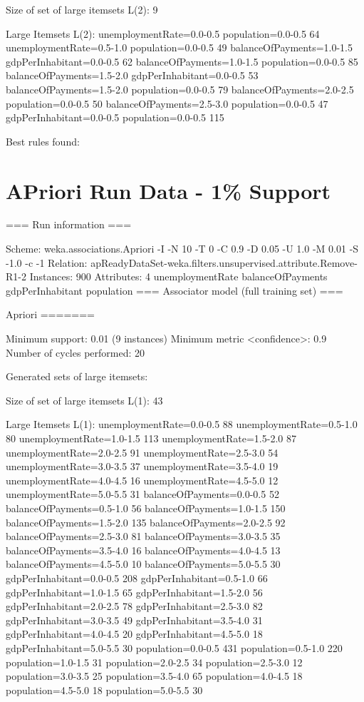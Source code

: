 Size of set of large itemsets L(2): 9

Large Itemsets L(2):
unemploymentRate=0.0-0.5 population=0.0-0.5 64
unemploymentRate=0.5-1.0 population=0.0-0.5 49
balanceOfPayments=1.0-1.5 gdpPerInhabitant=0.0-0.5 62
balanceOfPayments=1.0-1.5 population=0.0-0.5 85
balanceOfPayments=1.5-2.0 gdpPerInhabitant=0.0-0.5 53
balanceOfPayments=1.5-2.0 population=0.0-0.5 79
balanceOfPayments=2.0-2.5 population=0.0-0.5 50
balanceOfPayments=2.5-3.0 population=0.0-0.5 47
gdpPerInhabitant=0.0-0.5 population=0.0-0.5 115

Best rules found:

\section{APriori Run Data - 1\% Support}

=== Run information ===

Scheme:       weka.associations.Apriori -I -N 10 -T 0 -C 0.9 -D 0.05 -U 1.0 -M 0.01 -S -1.0 -c -1
Relation:     apReadyDataSet-weka.filters.unsupervised.attribute.Remove-R1-2
Instances:    900
Attributes:   4
              unemploymentRate
              balanceOfPayments
              gdpPerInhabitant
              population
=== Associator model (full training set) ===


Apriori
=======

Minimum support: 0.01 (9 instances)
Minimum metric <confidence>: 0.9
Number of cycles performed: 20

Generated sets of large itemsets:

Size of set of large itemsets L(1): 43

Large Itemsets L(1):
unemploymentRate=0.0-0.5 88
unemploymentRate=0.5-1.0 80
unemploymentRate=1.0-1.5 113
unemploymentRate=1.5-2.0 87
unemploymentRate=2.0-2.5 91
unemploymentRate=2.5-3.0 54
unemploymentRate=3.0-3.5 37
unemploymentRate=3.5-4.0 19
unemploymentRate=4.0-4.5 16
unemploymentRate=4.5-5.0 12
unemploymentRate=5.0-5.5 31
balanceOfPayments=0.0-0.5 52
balanceOfPayments=0.5-1.0 56
balanceOfPayments=1.0-1.5 150
balanceOfPayments=1.5-2.0 135
balanceOfPayments=2.0-2.5 92
balanceOfPayments=2.5-3.0 81
balanceOfPayments=3.0-3.5 35
balanceOfPayments=3.5-4.0 16
balanceOfPayments=4.0-4.5 13
balanceOfPayments=4.5-5.0 10
balanceOfPayments=5.0-5.5 30
gdpPerInhabitant=0.0-0.5 208
gdpPerInhabitant=0.5-1.0 66
gdpPerInhabitant=1.0-1.5 65
gdpPerInhabitant=1.5-2.0 56
gdpPerInhabitant=2.0-2.5 78
gdpPerInhabitant=2.5-3.0 82
gdpPerInhabitant=3.0-3.5 49
gdpPerInhabitant=3.5-4.0 31
gdpPerInhabitant=4.0-4.5 20
gdpPerInhabitant=4.5-5.0 18
gdpPerInhabitant=5.0-5.5 30
population=0.0-0.5 431
population=0.5-1.0 220
population=1.0-1.5 31
population=2.0-2.5 34
population=2.5-3.0 12
population=3.0-3.5 25
population=3.5-4.0 65
population=4.0-4.5 18
population=4.5-5.0 18
population=5.0-5.5 30

